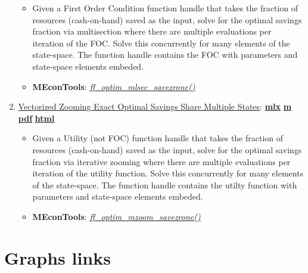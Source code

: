 \documentclass[
]{book}
\providecommand{\tightlist}{%
  \setlength{\itemsep}{0pt}\setlength{\parskip}{0pt}}
\begin{document}
\begin{enumerate}
  \begin{itemize}
  \tightlist
  \item
    Given a First Order Condition function handle that takes the fraction of resources (cash-on-hand) saved as the input, solve for the optimal savings fraction via multisection where there are multiple evaluations per iteration of the FOC. Solve this concurrently for many elements of the state-space. The function handle contains the FOC with parameters and state-space elements embeded.
  \item
    \textbf{MEconTools}: \emph{\href{https://github.com/FanWangEcon/MEconTools/blob/master/MEconTools/optim/ff_optim_mlsec_savezrone.m}{ff\_optim\_mlsec\_savezrone()}}
  \end{itemize}
\item
  \href{https://fanwangecon.github.io/MEconTools/MEconTools/doc/optim/htmlpdfm/fx_optim_mzoom_savezrone.html}{Vectorized Zooming Exact Optimal Savings Share Multiple States}: \href{https://github.com/FanWangEcon/MEconTools/blob/master/MEconTools/doc/optim/fx_optim_mzoom_savezrone.mlx}{\textbf{mlx}} \textbar{} \href{https://github.com/FanWangEcon/MEconTools/blob/master/MEconTools/doc/optim/htmlpdfm/fx_optim_mzoom_savezrone.m}{\textbf{m}} \textbar{} \href{https://github.com/FanWangEcon/MEconTools/blob/master/MEconTools/doc/optim/htmlpdfm/fx_optim_mzoom_savezrone.pdf}{\textbf{pdf}} \textbar{} \href{https://fanwangecon.github.io/MEconTools/MEconTools/doc/optim/htmlpdfm/fx_optim_mzoom_savezrone.html}{\textbf{html}}

  \begin{itemize}
  \tightlist
  \item
    Given a Utility (not FOC) function handle that takes the fraction of resources (cash-on-hand) saved as the input, solve for the optimal savings fraction via iterative zooming where there are multiple evaluations per iteration of the utility function. Solve this concurrently for many elements of the state-space. The function handle contains the utilty function with parameters and state-space elements embeded.
  \item
    \textbf{MEconTools}: \emph{\href{https://github.com/FanWangEcon/MEconTools/blob/master/MEconTools/optim/ff_optim_mzoom_savezrone.m}{ff\_optim\_mzoom\_savezrone()}}
  \end{itemize}
\end{enumerate}

\hypertarget{graphs-links}{%
\section{Graphs links}\label{graphs-links}}
\end{document}
